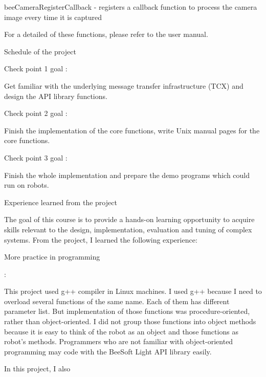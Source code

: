 {\begin{enumerate}
  beeCameraRegisterCallback - registers a callback function to process
  the camera image every time it is captured\end{enumerate}\par
For a detailed of these functions, please refer to the user manual.
\par \par Schedule of the project\par \begin{itemize}{\bf \item Check
    point 1 goal : }Get familiar with the underlying message transfer
  infrastructure (TCX) and design the API library functions.
\end{itemize}\begin{itemize}{\bf \item Check point 2 goal :} Finish
  the implementation of the core functions, write Unix manual pages
  for the core functions. \end{itemize}\begin{itemize}{\bf \item
    Check point 3 goal :} Finish the whole implementation and prepare
  the demo programs which could run on robots.\end{itemize}\par
Experience learned from the project\par \par The goal of this course
is to provide a hands-on learning opportunity to acquire skills
relevant to the design, implementation, evaluation and tuning of
complex systems. From the project, I learned the following
experience:\par \begin{itemize}{\bf \item More practice in
    programming}:\end{itemize}\par This project used g++
compiler in Linux machines. I used g++ because I need to overload
several functions of the same name. Each of them has different
parameter list. But implementation of those functions was
procedure-oriented, rather than object-oriented. I did not group those
functions into object methods because it is easy to think of the robot
as an object and those functions as robot's methods. Programmers who
are not familiar with object-oriented programming may code with the
BeeSoft Light API library easily. \par \par In this project, I also
}
